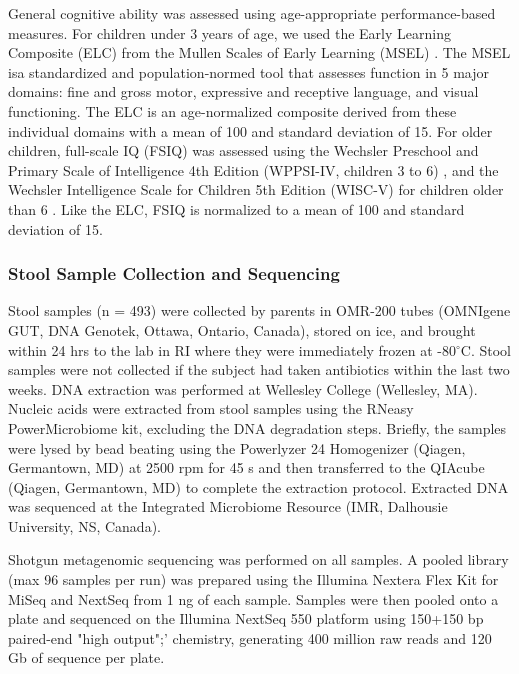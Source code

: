\documentclass{article}
\begin{document}
General cognitive ability was assessed using age-appropriate performance-based measures.
For children under 3 years of age, we used the Early Learning
Composite (ELC) from the Mullen Scales of Early Learning (MSEL)
\cite{mullenMullenScalesEarly1995}.
The MSEL isa standardized and population-normed tool that assesses 
function in 5 major domains: fine and gross motor, expressive and receptive language,  
and visual functioning.
The ELC is an age-normalized composite derived from these individual domains
with a mean of 100 and standard deviation of 15. For older children, full-scale IQ (FSIQ)
was assessed using the Wechsler Preschool and Primary Scale of Intelligence 4th Edition
(WPPSI-IV, children 3 to 6) \cite{wechslerWechslerPreschoolPrimary2012},
and the Wechsler Intelligence Scale for Children 5th Edition (WISC-V)
for children older than 6 \cite{wechslerWechslerIntelligenceScale1949}. 
Like the ELC, FSIQ is normalized to a mean of 100 and standard deviation of 15.


\subsubsection*{Stool Sample Collection and Sequencing}

Stool samples (n = 493) were collected by parents in OMR-200 tubes
(OMNIgene GUT, DNA Genotek, Ottawa, Ontario, Canada), stored on ice, and
brought within 24 hrs to the lab in RI where they were immediately
frozen at -80$^{\circ}$C. Stool samples were not collected if the subject had
taken antibiotics within the last two weeks. DNA extraction was
performed at Wellesley College (Wellesley, MA). Nucleic acids were
extracted from stool samples using the RNeasy PowerMicrobiome kit,
excluding the DNA degradation steps. Briefly, the samples were lysed by
bead beating using the Powerlyzer 24 Homogenizer (Qiagen, Germantown,
MD) at 2500 rpm for 45 s and then transferred to the QIAcube (Qiagen,
Germantown, MD) to complete the extraction protocol. Extracted DNA was
sequenced at the Integrated Microbiome Resource (IMR, Dalhousie
University, NS, Canada).

Shotgun metagenomic sequencing was performed on all samples. A pooled
library (max 96 samples per run) was prepared using the Illumina Nextera
Flex Kit for MiSeq and NextSeq from 1 ng of each sample. Samples were
then pooled onto a plate and sequenced on the Illumina NextSeq 550
platform using 150+150 bp paired-end "high output";' chemistry,
generating 400 million raw reads and 120 Gb of sequence per plate.
\end{document}
